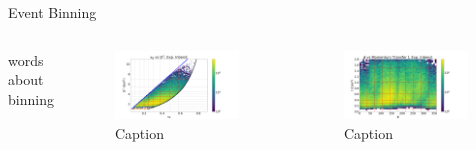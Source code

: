 \documentclass[aspectratio=169]{beamer}
\begin{document}
\begin{frame}{Event Binning}

\begin{columns}
        words about binning
            \begin{figure}
                \centering
                \includegraphics[width=0.97\textwidth]{defense/x_B_vs_Q2,_Exp_Inbend.png}
                \caption{Caption}
                \label{fig:enter-label}
            \end{figure}
            \begin{figure}
                \centering
                \includegraphics[width=0.97\textwidth]{defense/phi_vs_Momentum_Transfer_t,_Exp_Inbend.png}
                \caption{Caption}
                \label{fig:enter-label}
            \end{figure}

\end{columns}
\end{frame}
\end{document}
